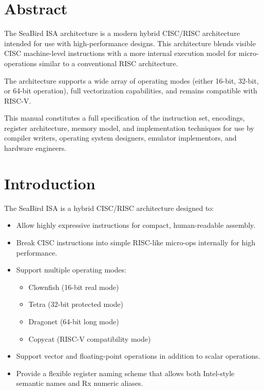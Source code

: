 \documentclass[12pt]{article}
\begin{document}
\vspace{1cm}

\section*{Abstract}

The SeaBird ISA architecture is a modern hybrid CISC/RISC architecture intended for use with high-performance designs. This architecture blends visible CISC machine-level instructions with a more internal execution model for micro-operations similar to a conventional RISC architecture.

The architecture supports a wide array of operating modes (either 16-bit, 32-bit, or 64-bit operation), full vectorization capabilities, and remains compatible with RISC-V.

This manual constitutes a full specification of the instruction set, encodings, register architecture, memory model, and implementation techniques for use by compiler writers, operating system designers, emulator implementors, and hardware engineers.

\tableofcontents
\newpage

\section{Introduction}

The SeaBird ISA is a hybrid CISC/RISC architecture designed to:

\begin{itemize}
    \item Allow highly expressive instructions for compact, human-readable assembly.
    \item Break CISC instructions into simple RISC-like micro-ops internally for high performance.
    \item Support multiple operating modes:
    \begin{itemize}
        \item Clownfish (16-bit real mode)
        \item Tetra (32-bit protected mode)
        \item Dragonet (64-bit long mode)
        \item Copycat (RISC-V compatibility mode)
    \end{itemize}
    \item Support vector and floating-point operations in addition to scalar operations.
    \item Provide a flexible register naming scheme that allows both Intel-style semantic names and Rx numeric aliases.
\end{itemize}
\end{document}
